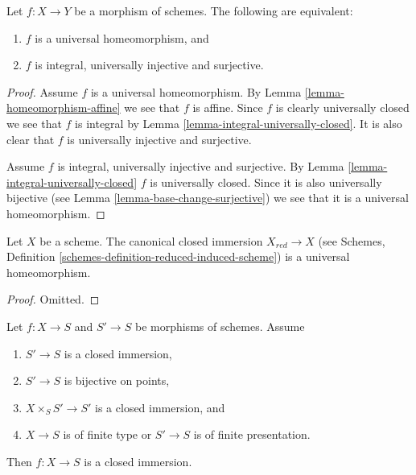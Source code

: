 \begin{lemma}
\label{lemma-universal-homeomorphism}
Let $f : X \to Y$ be a morphism of schemes. The following are
equivalent:
\begin{enumerate}
\item $f$ is a universal homeomorphism, and
\item $f$ is integral, universally injective and surjective.
\end{enumerate}
\end{lemma}

\begin{proof}
Assume $f$ is a universal homeomorphism. By
Lemma \ref{lemma-homeomorphism-affine}
we see that $f$ is affine. Since $f$ is clearly universally closed we
see that $f$ is integral by
Lemma \ref{lemma-integral-universally-closed}.
It is also clear that $f$ is universally injective and surjective.

\medskip\noindent
Assume $f$ is integral, universally injective and surjective. By
Lemma \ref{lemma-integral-universally-closed}
$f$ is universally closed. Since it is also universally bijective (see
Lemma \ref{lemma-base-change-surjective})
we see that it is a universal homeomorphism.
\end{proof}

\begin{lemma}
\label{lemma-reduction-universal-homeomorphism}
Let $X$ be a scheme. The canonical closed immersion $X_{red} \to X$ (see
Schemes, Definition \ref{schemes-definition-reduced-induced-scheme})
is a universal homeomorphism.
\end{lemma}

\begin{proof}
Omitted.
\end{proof}

\begin{lemma}
\label{lemma-check-closed-infinitesimally}
Let $f : X \to S$ and $S' \to S$ be morphisms of schemes.
Assume
\begin{enumerate}
\item $S' \to S$ is a closed immersion,
\item $S' \to S$ is bijective on points,
\item $X \times_S S' \to S'$ is a closed immersion, and
\item $X \to S$ is of finite type or $S' \to S$ is of finite presentation.
\end{enumerate}
Then $f : X \to S$ is a closed immersion.
\end{lemma}

